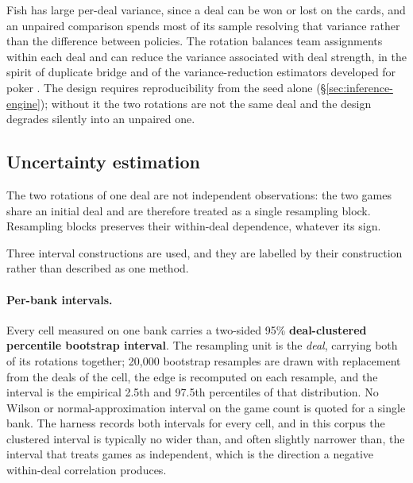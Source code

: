 Fish has large per-deal variance, since a deal can be won or lost on the cards, and an unpaired
comparison spends most of its sample resolving that variance rather than the difference between
policies. The rotation balances team assignments within each deal and can reduce the variance associated
with deal strength, in the spirit of duplicate bridge and of the variance-reduction estimators
developed for poker \cite{zinkevich-divat,burch-aivat}. The design requires reproducibility from the seed alone
(\S\ref{sec:inference-engine}); without it the two rotations are not the same deal and the design
degrades silently into an unpaired one.

\subsection{Uncertainty estimation}
\label{sec:evaluation-intervals}

The two rotations of one deal are not independent observations: the two games share an initial deal
and are therefore treated as a single resampling block. Resampling blocks preserves their
within-deal dependence, whatever its sign.

Three interval constructions are used, and they are labelled by their construction rather than
described as one method.

\paragraph{Per-bank intervals.} Every cell measured on one bank carries a two-sided 95\%
  \textbf{deal-clustered percentile bootstrap interval}. The resampling unit is the \emph{deal},
  carrying both of its rotations together; 20{,}000 bootstrap resamples are drawn with replacement
  from the deals of the cell, the edge is recomputed on each resample, and the interval is the
  empirical 2.5th and 97.5th percentiles of that distribution. No Wilson or normal-approximation
  interval on the game count is quoted for a single bank. The harness records both intervals for
  every cell, and in this corpus the clustered interval is typically no wider than, and often
  slightly narrower than, the interval that treats games as independent, which is the direction a
  negative within-deal correlation produces.
